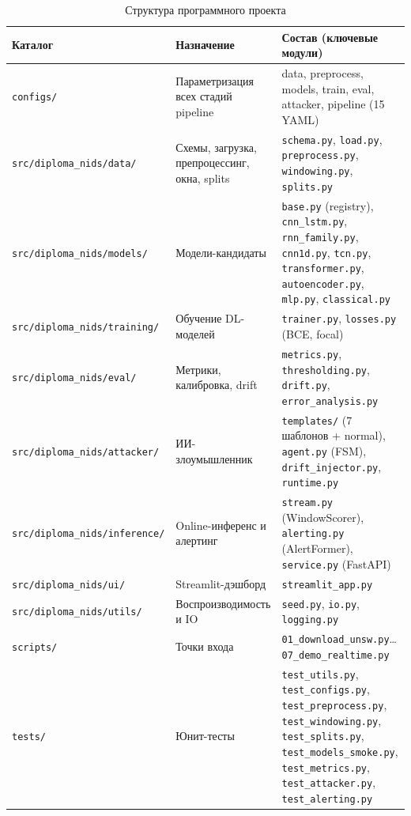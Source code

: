 \documentclass[14pt, a4paper]{extarticle}
\begin{document}
\begin{table}[H]
\centering
\caption{Структура программного проекта}
\label{tab:project-layout}
\renewcommand{\arraystretch}{1.2}
\setlength{\tabcolsep}{4pt}
\small
\begin{tabularx}{\linewidth}{@{}lXX@{}}
\toprule
\textbf{Каталог} & \textbf{Назначение} & \textbf{Состав (ключевые модули)} \\
\midrule
\texttt{configs/}      & Параметризация всех стадий pipeline &
data, preprocess, models, train, eval, attacker, pipeline (15 YAML) \\
\addlinespace
\texttt{src/diploma\_nids/data/} & Схемы, загрузка, препроцессинг, окна, splits &
\texttt{schema.py}, \texttt{load.py}, \texttt{preprocess.py},
\texttt{windowing.py}, \texttt{splits.py} \\
\addlinespace
\texttt{src/diploma\_nids/models/} & Модели-кандидаты &
\texttt{base.py} (registry), \texttt{cnn\_lstm.py},
\texttt{rnn\_family.py}, \texttt{cnn1d.py}, \texttt{tcn.py},
\texttt{transformer.py}, \texttt{autoencoder.py}, \texttt{mlp.py},
\texttt{classical.py} \\
\addlinespace
\texttt{src/diploma\_nids/training/} & Обучение DL-моделей &
\texttt{trainer.py}, \texttt{losses.py} (BCE, focal) \\
\addlinespace
\texttt{src/diploma\_nids/eval/} & Метрики, калибровка, drift &
\texttt{metrics.py}, \texttt{thresholding.py}, \texttt{drift.py},
\texttt{error\_analysis.py} \\
\addlinespace
\texttt{src/diploma\_nids/attacker/} & ИИ-злоумышленник &
\texttt{templates/} (7 шаблонов + normal), \texttt{agent.py} (FSM),
\texttt{drift\_injector.py}, \texttt{runtime.py} \\
\addlinespace
\texttt{src/diploma\_nids/inference/} & Online-инференс и алертинг &
\texttt{stream.py} (WindowScorer), \texttt{alerting.py} (AlertFormer),
\texttt{service.py} (FastAPI) \\
\addlinespace
\texttt{src/diploma\_nids/ui/} & Streamlit-дэшборд &
\texttt{streamlit\_app.py} \\
\addlinespace
\texttt{src/diploma\_nids/utils/} & Воспроизводимость и IO &
\texttt{seed.py}, \texttt{io.py}, \texttt{logging.py} \\
\addlinespace
\texttt{scripts/} & Точки входа &
\texttt{01\_download\_unsw.py}\dots\texttt{07\_demo\_realtime.py} \\
\addlinespace
\texttt{tests/} & Юнит-тесты &
\texttt{test\_utils.py}, \texttt{test\_configs.py},
\texttt{test\_preprocess.py}, \texttt{test\_windowing.py},
\texttt{test\_splits.py}, \texttt{test\_models\_smoke.py},
\texttt{test\_metrics.py}, \texttt{test\_attacker.py},
\texttt{test\_alerting.py} \\
\bottomrule
\end{tabularx}
\end{table}
\end{document}
